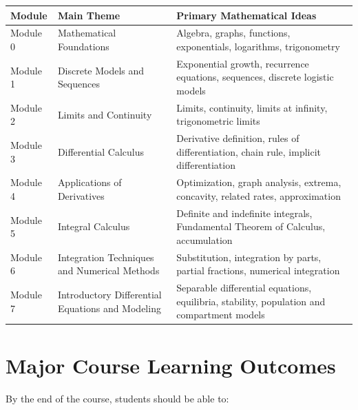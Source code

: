 \documentclass[11pt]{article}
\begin{document}
\begin{table}[h!]
\centering
\begin{tabular}{p{} p{} p{}}
\toprule
\textbf{Module} & \textbf{Main Theme} & \textbf{Primary Mathematical Ideas} \\
\midrule
Module 0 & Mathematical Foundations & Algebra, graphs, functions, exponentials, logarithms, trigonometry \\
Module 1 & Discrete Models and Sequences & Exponential growth, recurrence equations, sequences, discrete logistic models \\
Module 2 & Limits and Continuity & Limits, continuity, limits at infinity, trigonometric limits \\
Module 3 & Differential Calculus & Derivative definition, rules of differentiation, chain rule, implicit differentiation \\
Module 4 & Applications of Derivatives & Optimization, graph analysis, extrema, concavity, related rates, approximation \\
Module 5 & Integral Calculus & Definite and indefinite integrals, Fundamental Theorem of Calculus, accumulation \\
Module 6 & Integration Techniques and Numerical Methods & Substitution, integration by parts, partial fractions, numerical integration \\
Module 7 & Introductory Differential Equations and Modeling & Separable differential equations, equilibria, stability, population and compartment models \\
\bottomrule
\end{tabular}
\end{table}

\section{Major Course Learning Outcomes}

By the end of the course, students should be able to:
\end{document}
